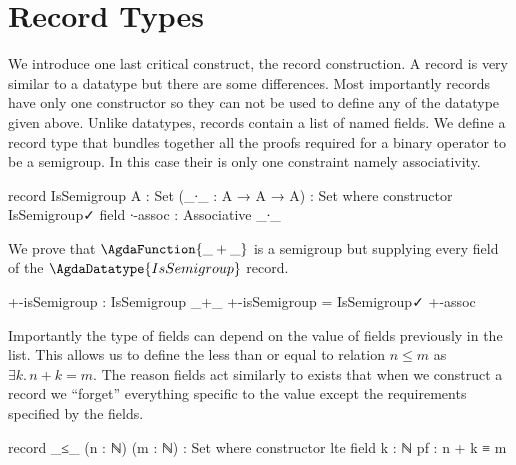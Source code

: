 \documentclass[./Thesis.tex]{subfiles}
\begin{document}
\section{Record Types}
\label{sec:record-types}
We introduce one last critical construct, the record construction. A record is
very similar to a datatype but there are some differences. Most importantly
records have only one constructor so they can not be used to define any of the
datatype given above. Unlike datatypes, records contain a list of named fields.
We define a record type that bundles together all the proofs required for a
binary operator to be a semigroup. In this case their is only one constraint
namely associativity. \\
\begin{code}
    record IsSemigroup {A : Set} (_∙_ : A → A → A) : Set where
      constructor IsSemigroup✓
      field
        ∙-assoc : Associative _∙_
\end{code}
We prove that $\AgdaFunction{\_+\_}$ is a semigroup but supplying every
field of the $\AgdaDatatype{IsSemigroup}$ record.
\begin{code}
    +-isSemigroup : IsSemigroup _+_
    +-isSemigroup = IsSemigroup✓ +-assoc
\end{code}
Importantly the type of fields can depend on the value of fields previously in
the list. This allows us to define the less than or equal to relation $n \leq m$
as $\exists k. \, n + k = m$. The reason fields act similarly to exists
that when we construct a record we ``forget'' everything specific to the value
except the requirements specified by the fields.
\begin{code}
    record _≤_ (n : ℕ) (m : ℕ) : Set where
      constructor lte
      field
        k : ℕ
        pf : n + k ≡ m
\end{code}



\end{document}
